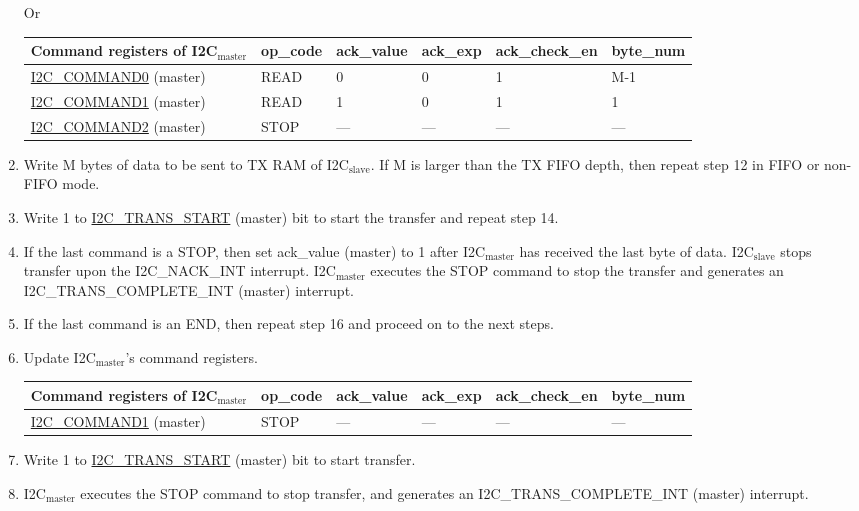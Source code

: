 \documentclass[main\_\_EN.tex]{subfiles}
\begin{document}
\begin{enumerate}
Or

\begin{longtable}{ | p{5cm} | p{1.5cm} | p{1.5cm} | p{1.5cm} |p{2.5cm} | p{1.5cm} |}
\hline\rowcolor{lightgray}
Command registers of I2C$_\text{master}$& op\_code & ack\_value&ack\_exp&ack\_check\_en&byte\_num  \\ \hline
\hyperref[fielddesc:I2CCOMMAND0]{I2C\_COMMAND0} (master)& READ& 0&0&1&M-1  \\ \hline
\hyperref[fielddesc:I2CCOMMAND1]{I2C\_COMMAND1} (master)& READ& 1&0&1&1  \\ \hline
\hyperref[fielddesc:I2CCOMMAND2]{I2C\_COMMAND2} (master)& STOP& ---&---&---&---  \\ \hline
\end{longtable}

\item Write M bytes of data to be sent to TX RAM of I2C$_\text{slave}$. If M is larger than the TX FIFO depth, then repeat step 12 in FIFO or non-FIFO mode.
\item Write 1 to \hyperref[fielddesc:I2CTRANSSTART]{I2C\_TRANS\_START} (master) bit to start the transfer and repeat step 14.
\item If the last command is a STOP, then set ack\_value (master) to 1 after I2C$_\text{master}$ has received the last byte of data. I2C$_\text{slave}$ stops transfer upon the I2C\_NACK\_INT interrupt. I2C$_\text{master}$ executes the STOP command to stop the transfer and generates an I2C\_TRANS\_COMPLETE\_INT (master) interrupt.
\item If the last command is an END, then repeat step 16 and proceed on to the next steps.
\item Update I2C$_\text{master}$'s command registers.

\begin{longtable}{ | p{5cm} | p{1.5cm} | p{1.5cm} | p{1.5cm} |p{2.5cm} | p{1.5cm} |}
\hline\rowcolor{lightgray}
Command registers of I2C$_\text{master}$& op\_code & ack\_value&ack\_exp&ack\_check\_en&byte\_num  \\ \hline
\hyperref[fielddesc:I2CCOMMAND1]{I2C\_COMMAND1} (master)& STOP& ---&---&---&---  \\ \hline
\end{longtable}

\item Write 1 to \hyperref[fielddesc:I2CTRANSSTART]{I2C\_TRANS\_START} (master) bit to start transfer.
\item I2C$_\text{master}$ executes the STOP command to stop transfer, and generates an I2C\_TRANS\_COMPLETE\_INT (master) interrupt.
\end{enumerate}
\end{document}
